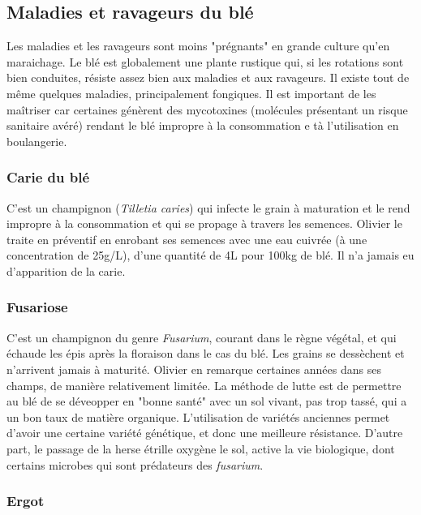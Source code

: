 \documentclass{article}
\begin{document}
\subsection{Maladies et ravageurs du blé}

Les maladies et les ravageurs sont moins "prégnants" en grande culture qu'en maraichage. Le blé est globalement une plante rustique qui, si les rotations sont bien conduites, résiste assez bien aux maladies et aux ravageurs. Il existe tout de même quelques maladies, principalement fongiques. Il est important de les maîtriser car certaines génèrent des mycotoxines (molécules présentant un risque sanitaire avéré) rendant le blé impropre à la consommation e tà l'utilisation en boulangerie. 

\subsubsection{Carie du blé}

C'est un champignon (\textit{Tilletia caries}) qui infecte le grain à maturation et le rend impropre à la consommation et qui se propage à travers les semences. Olivier le traite en préventif en enrobant ses semences avec une eau cuivrée (à une concentration de 25g/L), d'une quantité de 4L pour 100kg de blé. Il n'a jamais eu d'apparition de la carie.

\subsubsection{Fusariose}

C'est un champignon du genre \textit{Fusarium}, courant dans le règne végétal, et qui échaude les épis après la floraison dans le cas du blé. Les grains se dessèchent et n'arrivent jamais à maturité. Olivier en remarque certaines années dans ses champs, de manière relativement limitée. La méthode de lutte est de permettre au blé de se déveopper en "bonne santé" avec un sol vivant, pas trop tassé, qui a un bon taux de matière organique. L'utilisation de variétés anciennes permet d'avoir une certaine variété génétique, et donc une meilleure résistance. D'autre part, le passage de la herse étrille oxygène le sol, active la vie biologique, dont certains microbes qui sont prédateurs des \textit{fusarium}.

\subsubsection{Ergot}
\end{document}
